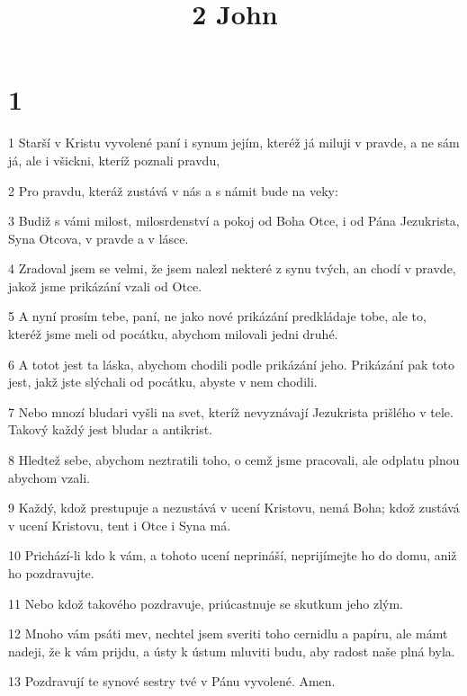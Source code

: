 

\title{2 John}

\chapter{1}

\par 1 Starší v Kristu vyvolené paní i synum jejím, kteréž já miluji v pravde, a ne sám já, ale i všickni, kteríž poznali pravdu,
\par 2 Pro pravdu, kteráž zustává v nás a s námit bude na veky:
\par 3 Budiž s vámi milost, milosrdenství a pokoj od Boha Otce, i od Pána Jezukrista, Syna Otcova, v pravde a v lásce.
\par 4 Zradoval jsem se velmi, že jsem nalezl nekteré z synu tvých, an chodí v pravde, jakož jsme prikázání vzali od Otce.
\par 5 A nyní prosím tebe, paní, ne jako nové prikázání predkládaje tobe, ale to, kteréž jsme meli od pocátku, abychom milovali jedni druhé.
\par 6 A totot jest ta láska, abychom chodili podle prikázání jeho. Prikázání pak toto jest, jakž jste slýchali od pocátku, abyste v nem chodili.
\par 7 Nebo mnozí bludari vyšli na svet, kteríž nevyznávají Jezukrista prišlého v tele. Takový každý jest bludar a antikrist.
\par 8 Hledtež sebe, abychom neztratili toho, o cemž jsme pracovali, ale odplatu plnou abychom vzali.
\par 9 Každý, kdož prestupuje a nezustává v ucení Kristovu, nemá Boha; kdož zustává v ucení Kristovu, tent i Otce i Syna má.
\par 10 Prichází-li kdo k vám, a tohoto ucení neprináší, neprijímejte ho do domu, aniž ho pozdravujte.
\par 11 Nebo kdož takového pozdravuje, priúcastnuje se skutkum jeho zlým.
\par 12 Mnoho vám psáti mev, nechtel jsem sveriti toho cernidlu a papíru, ale mámt nadeji, že k vám prijdu, a ústy k ústum mluviti budu, aby radost naše plná byla.
\par 13 Pozdravují te synové sestry tvé v Pánu vyvolené. Amen.



